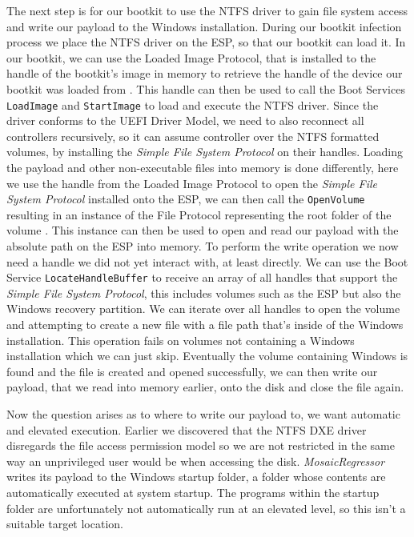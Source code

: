 The next step is for our bootkit to use the NTFS driver to gain file system access and write our payload to the Windows installation. During our bootkit infection process we place the NTFS driver on the \ac{ESP}, so that our bootkit can load it. In our bootkit, we can use the Loaded Image Protocol, that is installed to the handle of the bootkit's image in memory to retrieve the handle of the device our bootkit was loaded from \cite[9.1 EFI Loaded Image Protocol]{uefi-spec}. This handle can then be used to call the Boot Services \lstinline{LoadImage} and \lstinline{StartImage} to load and execute the NTFS driver. Since the driver conforms to the UEFI Driver Model, we need to also reconnect all controllers recursively, so it can assume controller over the NTFS formatted volumes, by installing the \emph{Simple File System Protocol} on their handles. Loading the payload and other non-executable files into memory is done differently, here we use the handle from the Loaded Image Protocol to open the \emph{Simple File System Protocol} installed onto the \ac{ESP}, we can then call the \lstinline{OpenVolume} resulting in an instance of the File Protocol representing the root folder of the volume \cite[13.4]{uefi-spec}. This instance can then be used to open and read our payload with the absolute path on the \ac{ESP} into memory.
To perform the write operation we now need a handle we did not yet interact with, at least directly. We can use the Boot Service \lstinline{LocateHandleBuffer} to receive an array of all handles that support the \emph{Simple File System Protocol}, this includes volumes such as the \ac{ESP} but also the Windows recovery partition. We can iterate over all handles to open the volume and attempting to create a new file with a file path that's inside of the Windows installation. This operation fails on volumes not containing a Windows installation which we can just skip. Eventually the volume containing Windows is found and the file is created and opened successfully, we can then write our payload, that we read into memory earlier, onto the disk and close the file again.

Now the question arises as to where to write our payload to, we want automatic and elevated execution. Earlier we discovered that the \ac{NTFS} \ac{DXE} driver disregards the file access permission model  so we are not restricted in the same way an unprivileged user would be when accessing the disk. \emph{MosaicRegressor} writes its payload to the Windows startup folder, a folder whose contents are automatically executed at system startup. The programs within the startup folder are unfortunately not automatically run at an elevated level, so this isn't a suitable target location.

